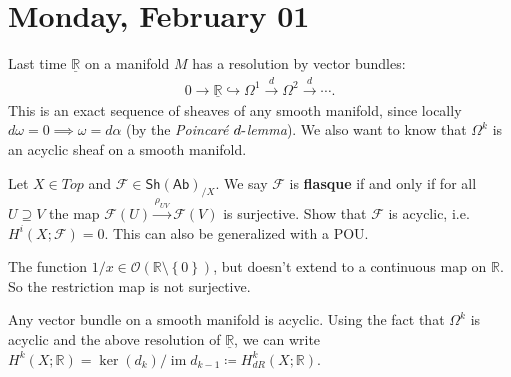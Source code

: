 \hypertarget{monday-february-01}{%
\section{Monday, February 01}\label{monday-february-01}}

\begin{remark}

Last time \(\underline{{\mathbb{R}}}\) on a manifold \(M\) has a
resolution by vector bundles:
\begin{align*}
0 \to \underline{{\mathbb{R}}} \hookrightarrow\Omega^1 \xrightarrow{d} \Omega^2 \xrightarrow{d} \cdots
.\end{align*}
This is an exact sequence of sheaves of any smooth manifold, since
locally \(d \omega = 0 \implies \omega = d \alpha\) (by the
\emph{Poincaré \(d {\hbox{-}}\)lemma}). We also want to know that
\(\Omega^k\) is an acyclic sheaf on a smooth manifold.

\end{remark}

\begin{exercise}[?]

Let \(X\in Top\) and
\(\mathcal{F}\in {\mathsf{Sh}}({\mathsf{Ab}})_{/X}\). We say
\(\mathcal{F}\) is \textbf{flasque} if and only if for all
\(U \supseteq V\) the map
\(\mathcal{F}(U) \xrightarrow{\rho_{UV}} \mathcal{F}(V)\) is surjective.
Show that \(\mathcal{F}\) is acyclic, i.e.~\(H^i(X; \mathcal{F}) = 0\).
This can also be generalized with a POU.

\end{exercise}

\begin{example}[?]

The function
\(1/x\in {\mathcal{O}}({\mathbb{R}}\setminus\left\{{0}\right\})\), but
doesn't extend to a continuous map on \({\mathbb{R}}\). So the
restriction map is not surjective.

\end{example}

\begin{remark}

Any vector bundle on a smooth manifold is acyclic. Using the fact that
\(\Omega^k\) is acyclic and the above resolution of
\(\underline{{\mathbb{R}}}\), we can write
\(H^k(X; {\mathbb{R}}) = \ker(d_k) / \operatorname{im}d_{k-1} \coloneqq H^k_{dR}(X; {\mathbb{R}})\).

\end{remark}

